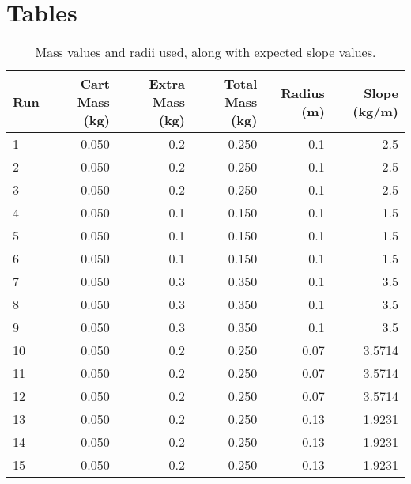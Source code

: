 \section{Tables}
\begin{table}
    \centering
    \begin{tabular}{|l|r|r|r|r|r|}
        \hline
        Run & Cart Mass (kg) & Extra Mass (kg) & Total Mass (kg) & Radius (m) & Slope (kg/m) \\
        \hline
        1 & 0.050 & 0.2 & 0.250 & 0.1 & 2.5 \\
        2 & 0.050 & 0.2 & 0.250 & 0.1 & 2.5 \\
        3 & 0.050 & 0.2 & 0.250 & 0.1 & 2.5 \\
        \hline
        4 & 0.050 & 0.1 & 0.150 & 0.1 & 1.5 \\
        5 & 0.050 & 0.1 & 0.150 & 0.1 & 1.5 \\
        6 & 0.050 & 0.1 & 0.150 & 0.1 & 1.5 \\
        \hline
        7 & 0.050 & 0.3 & 0.350 & 0.1 & 3.5 \\
        8 & 0.050 & 0.3 & 0.350 & 0.1 & 3.5 \\
        9 & 0.050 & 0.3 & 0.350 & 0.1 & 3.5 \\
        \hline
        10 & 0.050 & 0.2 & 0.250 & 0.07 & 3.5714 \\
        11 & 0.050 & 0.2 & 0.250 & 0.07 & 3.5714 \\
        12 & 0.050 & 0.2 & 0.250 & 0.07 & 3.5714 \\
        \hline
        13 & 0.050 & 0.2 & 0.250 & 0.13 & 1.9231 \\
        14 & 0.050 & 0.2 & 0.250 & 0.13 & 1.9231 \\
        15 & 0.050 & 0.2 & 0.250 & 0.13 & 1.9231 \\
        \hline
    \end{tabular}
    \caption{Mass values and radii used, along with expected slope values.}
    \label{table:10.m.r}
\end{table}
